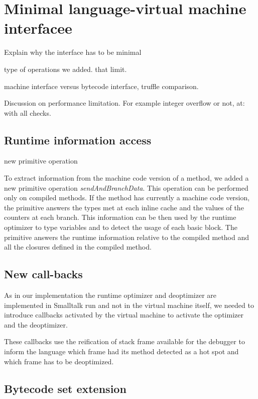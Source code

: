 \documentclass[a4paper,12pt,twoside]{../includes/ThesisStyle}
\begin{document}
\fi

\chapter{Minimal language-virtual machine interfacee}
\label{chap:interface}
\minitoc


Explain why the interface has to be minimal

type of operations we added. that limit.

machine interface versus bytecode interface, truffle comparison.

Discussion on performance limitation. For example integer overflow or not, at: with all checks.


\section{Runtime information access}

new primitive operation

To extract information from the machine code version of a method, we added a new primitive operation \emph{sendAndBranchData}. This operation can be performed only on compiled methods. If the method has currently a machine code version, the primitive answers the types met at each inline cache and the values of the counters at each branch. This information can be then used by the runtime optimizer to type variables and to detect the usage of each basic block. The primitive answers the runtime information relative to the compiled method and all the closures defined in the compiled method.

\section{New call-backs}

As in our implementation the runtime optimizer and deoptimizer are implemented in Smalltalk run and not in the virtual machine itself, we needed to introduce callbacks activated by the virtual machine to activate the optimizer and the deoptimizer. 

These callbacks use the reification of stack frame available for the debugger to inform the language which frame had its method detected as a hot spot and which frame has to be deoptimized.

\section{Bytecode set extension}
\end{document}
